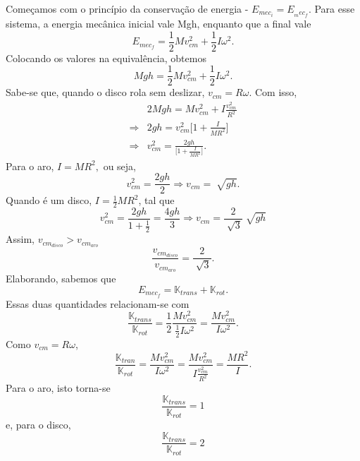\documentclass{article}
\begin{document}
Começamos com o princípio da conservação de energia - \(E_{mec_{i}} = E_{_mec_{f}}\). Para esse sistema, a energia mecânica inicial
vale Mgh, enquanto que a final vale 
\[
  E_{mec_{f}} = \frac{1}{2}Mv_{cm}^{2} + \frac{1}{2}I\omega^{2}.
\]
Colocando os valores na equivalência, obtemos 
\[
  Mgh = \frac{1}{2}Mv_{cm}^{2} + \frac{1}{2}I\omega^{2}.
\]
Sabe-se que, quando o disco rola sem deslizar, \(v_{cm} = R\omega \). Com isso,
\begin{align*}
   &2Mgh = Mv_{cm}^{2} + I \frac{v_{cm}^{2}}{R^{2}}\\
  \Rightarrow &2gh = v_{cm}^{2}\biggl[1 + \frac{I}{MR^{2}}\biggr]\\
  \Rightarrow &v_{cm}^{2} = \frac{2gh}{\biggl[1 + \frac{I}{MR^{2}}\biggr]}.
\end{align*}
Para o aro, \(I = MR^{2},\) ou seja, 
\[
  v_{cm}^{2} = \frac{2gh}{2} \Rightarrow v_{cm}=\sqrt[]{gh}.
\]
Quando é um disco, \(I=\frac{1}{2}MR^{2}\), tal que 
\[
  v_{cm}^{2} = \frac{2gh}{1 + \frac{1}{2}} = \frac{4gh}{3} \Rightarrow v_{cm} = \frac{2}{\sqrt[]{3}}\sqrt[]{gh}
\]
Assim, \(v_{cm_{disco}} > v_{cm_{aro}}\)
\[
  \frac{v_{cm_{disco}}}{v_{cm_{aro}}} = \frac{2}{\sqrt[]{3}}.
\]
Elaborando, sabemos que 
\[
  E_{mec_{f}} = \mathbb{K}_{trans} + \mathbb{K}_{rot}.
\]
Essas duas quantidades relacionam-se com 
\[
  \frac{\mathbb{K}_{trans}}{\mathbb{K}_{rot}} = \frac{1}{2}\frac{Mv_{cm}^{2}}{\frac{1}{2}I\omega^{2}} = \frac{Mv_{cm}^{2}}{I\omega^{2}}.
\]
Como \(v_{cm}=R\omega \), 
\[
  \frac{\mathbb{K}_{tran}}{\mathbb{K}_{rot}} = \frac{Mv_{cm}^{2}}{I\omega^{2}}=\frac{Mv_{cm}^{2}}{I \frac{v_{cm}^{2}}{R^{2}}} = \frac{MR^{2}}{I}.
\]
Para o aro, isto torna-se 
\[
  \frac{\mathbb{K}_{trans}}{\mathbb{K}_{rot}} = 1
\]
e, para o disco, 
\[
  \frac{\mathbb{K}_{trans}}{\mathbb{K}_{rot}} = 2
\]
\end{document}
